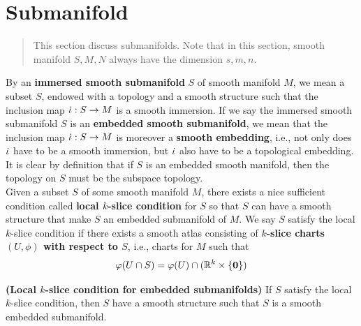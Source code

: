 \documentclass{report}
\begin{document}
\section{Submanifold}
\begin{abstract}
This section discuss submanifolds. Note that in this section, smooth manifold $S,M,N$ always have the dimension $s,m,n$. 
\end{abstract}
\begin{mdframed}
 By an \textbf{immersed smooth submanifold} $S$ of smooth manifold $M$, we mean a subset  $S$, endowed with a topology and a smooth structure such that the inclusion map  $\dot{\iota} : S\rightarrow M$ is a smooth immersion. If we say the immersed smooth submanifold $S$ is an \textbf{embedded smooth submanifold}, we mean that the inclusion map $\dot{\iota} : S \rightarrow M $ is moreover a \textbf{smooth embedding}, i.e., not only does $\dot{\iota} $ have to be a smooth immersion, but $\dot{\iota}  $ also have to be a topological embedding. It is clear by definition that if $S$ is an embedded smooth manifold, then the topology on $S$ must be the subspace topology.\\

  Given a subset $S$ of some smooth manifold  $M$, there exists a nice sufficient condition called  \textbf{local $k$-slice condition} for $S$ so that  $S$ can have a smooth structure that make $S$ an embedded submanifold of  $M$. We say $S$ satisfy the local $k$-slice condition if there exists a smooth atlas consisting of \textbf{$k$-slice charts $(U,\phi)$ with respect to $S$}, i.e., charts for $M$ such that  
\begin{align*}
\varphi (U \cap S)= \varphi (U)\cap (\mathbb{R}^k \times \{ \textbf{0} \})
\end{align*}
\end{mdframed}
\begin{theorem}
\textbf{(Local $k$-slice condition for embedded submanifolds)} If  $S$ satisfy the local  $k$-slice condition, then $S$ have a smooth structure such that $S$ is a smooth embedded submanifold. 
\end{theorem}
\end{document}

